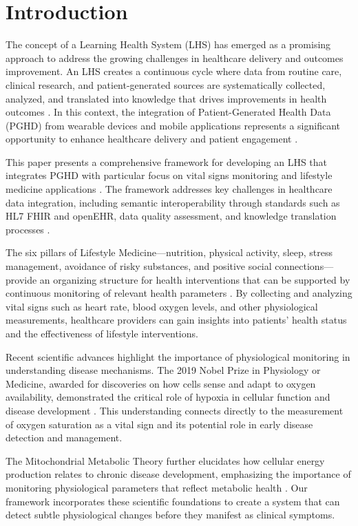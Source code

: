\section{Introduction}

The concept of a Learning Health System (LHS) has emerged as a promising approach to address the growing challenges in healthcare delivery and outcomes improvement. An LHS creates a continuous cycle where data from routine care, clinical research, and patient-generated sources are systematically collected, analyzed, and translated into knowledge that drives improvements in health outcomes \cite{institute2007learning}. In this context, the integration of Patient-Generated Health Data (PGHD) from wearable devices and mobile applications represents a significant opportunity to enhance healthcare delivery and patient engagement \cite{santos2023improving}.

This paper presents a comprehensive framework for developing an LHS that integrates PGHD with particular focus on vital signs monitoring and lifestyle medicine applications \cite{santos2024improving}. The framework addresses key challenges in healthcare data integration, including semantic interoperability through standards such as HL7 FHIR and openEHR, data quality assessment, and knowledge translation processes \cite{santos2024healthcare}.

The six pillars of Lifestyle Medicine—nutrition, physical activity, sleep, stress management, avoidance of risky substances, and positive social connections—provide an organizing structure for health interventions that can be supported by continuous monitoring of relevant health parameters \cite{clayton2023foundations}. By collecting and analyzing vital signs such as heart rate, blood oxygen levels, and other physiological measurements, healthcare providers can gain insights into patients' health status and the effectiveness of lifestyle interventions.

Recent scientific advances highlight the importance of physiological monitoring in understanding disease mechanisms. The 2019 Nobel Prize in Physiology or Medicine, awarded for discoveries on how cells sense and adapt to oxygen availability, demonstrated the critical role of hypoxia in cellular function and disease development \cite{nobel2019physiology}. This understanding connects directly to the measurement of oxygen saturation as a vital sign and its potential role in early disease detection and management.

The Mitochondrial Metabolic Theory further elucidates how cellular energy production relates to chronic disease development, emphasizing the importance of monitoring physiological parameters that reflect metabolic health \cite{bosco2020mitochondrial}. Our framework incorporates these scientific foundations to create a system that can detect subtle physiological changes before they manifest as clinical symptoms.

